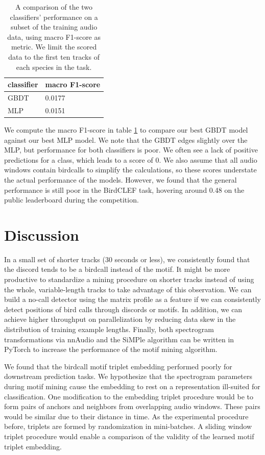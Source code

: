 \documentclass[
]{ceurart}
\begin{document}
\begin{table}[h]
\begin{tabular}{|l|l|}
\hline
classifier     & macro F1-score \\ \hline
GBDT           & 0.0177         \\ \hline
MLP            & 0.0151         \\ \hline
\end{tabular}
\caption{A comparison of the two classifiers' performance on a subset of the training audio data, using macro F1-score as metric. We limit the scored data to the first ten tracks of each species in the task.}
\label{tab:f1-score}
\end{table}

We compute the macro F1-score in table \ref{tab:f1-score} to compare our best GBDT model against our best MLP model. We note that the GBDT edges slightly over the MLP, but performance for both classifiers is poor. We often see a lack of positive predictions for a class, which leads to a score of 0. We also assume that all audio windows contain birdcalls to simplify the calculations, so these scores understate the actual performance of the models. However, we found that the general performance is still poor in the BirdCLEF task, hovering around 0.48 on the public leaderboard during the competition.

\section{Discussion}

In a small set of shorter tracks (30 seconds or less), we consistently found that the discord tends to be a birdcall instead of the motif. It might be more productive to standardize a mining procedure on shorter tracks instead of using the whole, variable-length tracks to take advantage of this observation. We can build a no-call detector using the matrix profile as a feature if we can consistently detect positions of bird calls through discords or motifs. In addition, we can achieve higher throughput on parallelization by reducing data skew in the distribution of training example lengths. Finally, both spectrogram transformations via nnAudio and the SiMPle algorithm can be written in PyTorch to increase the performance of the motif mining algorithm.

We found that the birdcall motif triplet embedding performed poorly for downstream prediction tasks. We hypothesize that the spectrogram parameters during motif mining cause the embedding to rest on a representation ill-suited for classification. One modification to the embedding triplet procedure would be to form pairs of anchors and neighbors from overlapping audio windows. These pairs would be similar due to their distance in time. As the experimental procedure before, triplets are formed by randomization in mini-batches. A sliding window triplet procedure would enable a comparison of the validity of the learned motif triplet embedding.
\end{document}

